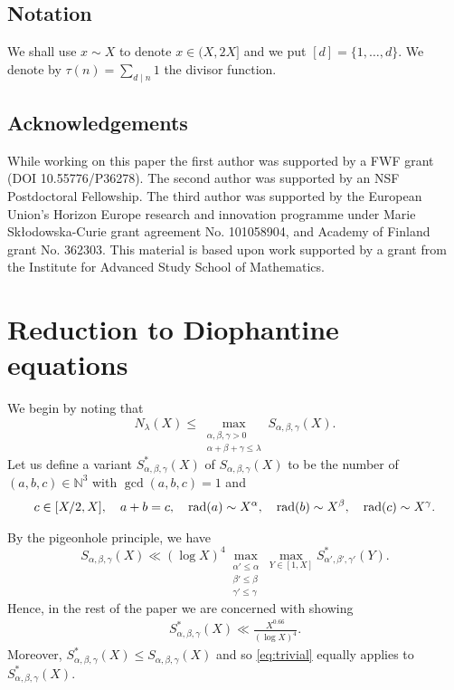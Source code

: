 \subsection*{Notation}
We shall use $x\sim X$ to denote $x\in (X,2X]$ and we put
$[d]=\{1,\dots,d\}$. We denote by $\tau(n)=\sum_{d\mid n}1$ the divisor function.

\subsection*{Acknowledgements}
While working on this paper
the first author was supported by
a FWF grant (DOI 10.55776/P36278).
The second author was supported by an NSF Postdoctoral Fellowship.
The third author was supported by the European Union's Horizon
Europe research and innovation programme under Marie Sk\l{}odowska-Curie grant agreement No. 101058904, and Academy of Finland grant No. 362303.
 This material is based upon work supported by a grant from the Institute
for Advanced Study School of Mathematics.



\section{Reduction to Diophantine equations}


We
 begin by noting that
\begin{equation}\label{eq:step1}
N_\lambda(X)\leq \max_{\substack{
\alpha,\beta,\gamma>0\\ \alpha+\beta+\gamma\leq \lambda}} S_{\alpha,\beta,\gamma}(X).
\end{equation}
Let us define a variant $S^*_{\alpha,\beta,\gamma}(X)$ of $S_{\alpha,\beta,\gamma}(X)$ to be the number of $(a,b,c)\in \mathbb{N}^3$ with $\gcd(a,b,c)=1$ and
\begin{align*}
c\in [X/2,X],\quad a+b=c,\quad \operatorname{rad}(a)\sim X^{\alpha},\quad \operatorname{rad}(b)\sim X^{\beta},\quad \operatorname{rad}(c)\sim X^{\gamma}.
\end{align*}

By the pigeonhole principle, we have
\begin{equation}\label{eq:S->S*}
S_{\alpha,\beta,\gamma}(X)\ll (\log X)^4\max_{\substack{\alpha'\leq \alpha\\\beta'\leq \beta\\\gamma'\leq \gamma}}\max_{Y\in [1,X]}S^*_{\alpha',\beta',\gamma'}(Y).
\end{equation}
Hence, in the rest of the paper we are concerned with showing
\begin{align}\label{eq:S*}
S^{*}_{\alpha,\beta,\gamma}(X)\ll \frac{X^{0.66}}{(\log X)^4}.
\end{align}
Moreover, $S^*_{\alpha,\beta,\gamma}(X)\leq S_{\alpha,\beta,\gamma}(X)$ and so
\eqref{eq:trivial} equally  applies to $S^*_{\alpha,\beta,\gamma}(X)$.


